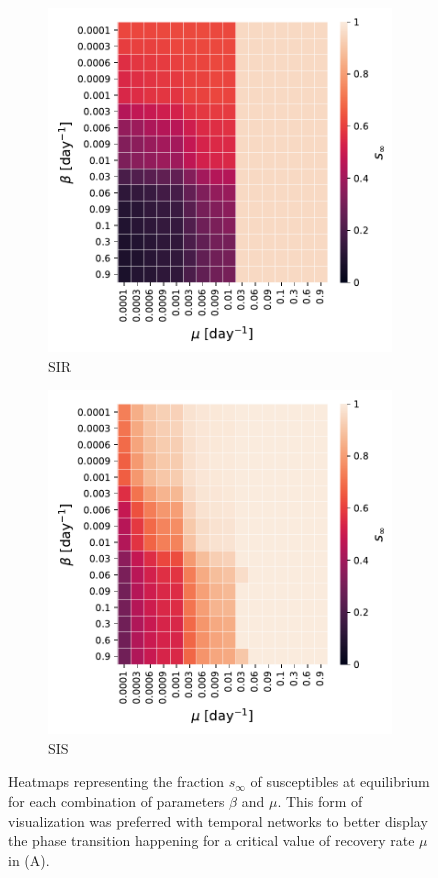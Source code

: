 \documentclass[a4paper,11pt, twocolumn]{article}
\begin{document}
\begin{figure}[H]
\begin{subfigure}[t]{0.49\textwidth}
\centering
\includegraphics[scale=0.52]{./Figure/Simulations/SIR_temporal_16482.pdf}
\caption{SIR}
\label{grid_SIR_temp}
\end{subfigure}
\begin{subfigure}[t]{0.49\textwidth}
\centering
\includegraphics[scale=0.52]{./Figure/Simulations/SIS_temporal_72633.pdf}
\caption{SIS}
\label{grid_SIS_temp}
\end{subfigure}
\caption{Heatmaps representing the fraction $s_{\infty}$ of susceptibles at equilibrium for each combination of parameters $\beta$ and $\mu$. This form of visualization was preferred with temporal networks to better display the phase transition happening for a critical value of recovery rate $\mu$ in (A).}
\end{figure}
\end{document}
